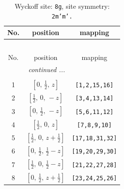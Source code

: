 \documentclass[fleqn,8pt]{jsarticle}
\begin{document}
\begin{longtable}{ccc}
\caption{Wyckoff site: {\tt 8g}, site symmetry: {\tt 2m'm'.}}
 \\
 \hline \hline
No. & position & mapping \\ \hline \endfirsthead

\multicolumn{2}{l}{\tablename\ \thetable{}} \\
 \hline \hline
No. & position & mapping \\ \hline \endhead

 \hline \hline
\multicolumn{2}{r}{\footnotesize\it continued ...} \\ \endfoot

 \hline \hline
\multicolumn{2}{r}{} \\ \endlastfoot

1 & $\left[ 0,\, \frac{1}{2},\, z \right]$ & {\tt [1,2,15,16]} \\ \hline
2 & $\left[ \frac{1}{2},\, 0,\, - z \right]$ & {\tt [3,4,13,14]} \\ \hline
3 & $\left[ 0,\, \frac{1}{2},\, - z \right]$ & {\tt [5,6,11,12]} \\ \hline
4 & $\left[ \frac{1}{2},\, 0,\, z \right]$ & {\tt [7,8,9,10]} \\ \hline
5 & $\left[ \frac{1}{2},\, 0,\, z + \frac{1}{2} \right]$ & {\tt [17,18,31,32]} \\ \hline
6 & $\left[ 0,\, \frac{1}{2},\, \frac{1}{2} - z \right]$ & {\tt [19,20,29,30]} \\ \hline
7 & $\left[ \frac{1}{2},\, 0,\, \frac{1}{2} - z \right]$ & {\tt [21,22,27,28]} \\ \hline
8 & $\left[ 0,\, \frac{1}{2},\, z + \frac{1}{2} \right]$ & {\tt [23,24,25,26]} \\
\end{longtable}
\renewcommand{\arraystretch}{1.2}
\end{document}
